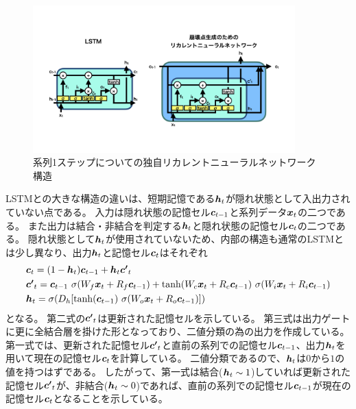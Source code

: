\begin{figure}[htbp]
 \centering
 \includegraphics[trim = 0 100 0 200, width=0.9\textwidth, clip]{Figure/3Networks/3-4-1-2VLSTMStructure.png}
 \caption{系列1ステップについての独自リカレントニューラルネットワーク構造}
 \label{3-4-1-2VLSTMStructure}
\end{figure}

LSTMとの大きな構造の違いは、短期記憶である${\mbox{\boldmath{$h$}}}_t$が隠れ状態として入出力されていない点である。
入力は隠れ状態の記憶セル${\mbox{\boldmath{$c$}}}_{t-1}$と系列データ${\mbox{\boldmath{$x$}}}_t$の二つである。
また出力は結合・非結合を判定する${\mbox{\boldmath{$h$}}}_t$と隠れ状態の記憶セル${\mbox{\boldmath{$c$}}}_{t}$の二つである。
隠れ状態として${\mbox{\boldmath{$h$}}}_t$が使用されていないため、内部の構造も通常のLSTMとは少し異なり、出力${\mbox{\boldmath{$h$}}}_{t}$と記憶セル${\mbox{\boldmath{$c$}}}_{t}$はそれぞれ
\begin{equation}
 \begin{split}
  &{\mbox{\boldmath{$c$}}}_{t} 
  = (1-{\mbox{\boldmath{$h$}}}_t) {\mbox{\boldmath{$c$}}}_{t-1} + {\mbox{\boldmath{$h$}}}_t {\mbox{\boldmath{$c'$}}}_{t}\\
  &{\mbox{\boldmath{$c'$}}}_{t}
  = {\mbox{\boldmath{$c$}}}_{t-1} \  \sigma (W_f {\mbox{\boldmath{$x$}}}_t + R_f {\mbox{\boldmath{$c$}}}_{t-1}) 
  + \tanh (W_c {\mbox{\boldmath{$x$}}}_t + R_c {\mbox{\boldmath{$c$}}}_{t-1}) \  \sigma (W_i {\mbox{\boldmath{$x$}}}_t + R_i {\mbox{\boldmath{$c$}}}_{t-1})\\
  &{\mbox{\boldmath{$h$}}}_{t} 
  = \sigma (D_h [\tanh({\mbox{\boldmath{$c$}}}_{t-1}) \  \sigma (W_o {\mbox{\boldmath{$x$}}}_t + R_o {\mbox{\boldmath{$c$}}}_{t-1}) ])
 \end{split}
\end{equation}
となる。
第二式の${\mbox{\boldmath{$c'$}}}_{t}$は更新された記憶セルを示している。
第三式は出力ゲートに更に全結合層を掛けた形となっており、二値分類の為の出力を作成している。
第一式では、更新された記憶セル${\mbox{\boldmath{$c'$}}}_{t}$と直前の系列での記憶セル${\mbox{\boldmath{$c$}}}_{t-1}$、出力${\mbox{\boldmath{$h$}}}_{t}$を用いて現在の記憶セル${\mbox{\boldmath{$c$}}}_{t}$を計算している。
二値分類であるので、${\mbox{\boldmath{$h$}}}_{t}$は$0$から$1$の値を持つはずである。
したがって、第一式は結合(${\mbox{\boldmath{$h$}}}_{t} \sim 1$)していれば更新された記憶セル${\mbox{\boldmath{$c'$}}}_{t}$が、非結合(${\mbox{\boldmath{$h$}}}_{t} \sim 0$)であれば、直前の系列での記憶セル${\mbox{\boldmath{$c$}}}_{t-1}$が現在の記憶セル${\mbox{\boldmath{$c$}}}_{t}$となることを示している。

